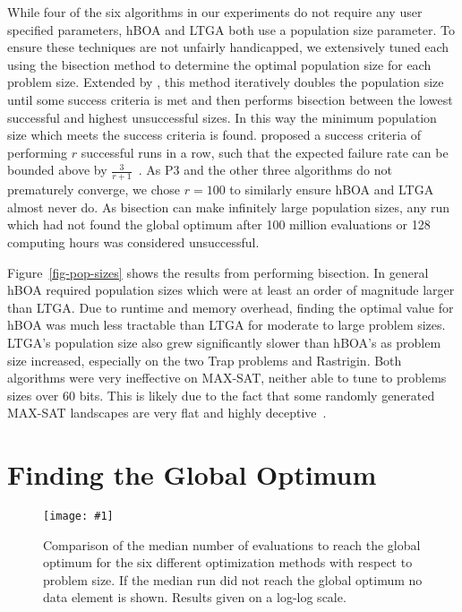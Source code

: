 \documentclass[twoside]{article}
\newcommand{\includegraphicsfit}[1]
{\texttt{[image: \#1]}}
\begin{document}
While four of the six algorithms in our experiments do not require any user specified parameters,
hBOA and LTGA both use a population size parameter. To ensure these techniques are not unfairly
handicapped, we extensively tuned each using the bisection method \citep{sastry:2001:bisection}
to determine the optimal population size for each problem size.
Extended by \cite{goldman:2012:ltga}, this method iteratively
doubles the population size until some success criteria is met and then performs bisection
between the lowest successful and highest unsuccessful sizes. In this way the minimum population size
which meets the success criteria is found. \cite{goldman:2014:p3} proposed a success criteria
of performing $r$ successful runs in a row, such that the expected failure rate can be bounded
above by $\frac{3}{r+1}$~\citep{jovanovic:1997:ruleofthree}. As P3 and the other three algorithms
do not prematurely converge, we chose $r=100$ to similarly ensure hBOA and LTGA almost never do.
As bisection can make infinitely large population sizes, any run which had not found the global
optimum after 100 million evaluations or 128 computing hours was considered unsuccessful.

Figure~\ref{fig-pop-sizes} shows the results from performing bisection. In general hBOA
required population sizes which were at least an order of magnitude larger than LTGA. Due to
runtime and memory overhead, finding the optimal value for hBOA was much less tractable than LTGA
for moderate to large problem sizes. LTGA's population size also grew significantly slower
than hBOA's as problem size increased, especially on the two Trap problems and Rastrigin.
Both algorithms were very ineffective on MAX-SAT, neither able to tune to problems sizes over 60 bits.
This is likely due to the fact that some randomly generated MAX-SAT landscapes are very flat
and highly deceptive~\citep{rana:1998:gamaxsat}.
\section{Finding the Global Optimum}
\label{sec-optimum}

\begin{figure}
  \begin{center}
  \includegraphicsfit{evals-to-success}
  \end{center}
  \caption{Comparison of the median number of evaluations to reach the global optimum for
           the six different optimization methods with respect
           to problem size.  If the median run did not reach the global optimum no data element
           is shown.  Results given on a log-log scale.}
  \label{fig-evals-to-success}
\end{figure}
\end{document}

